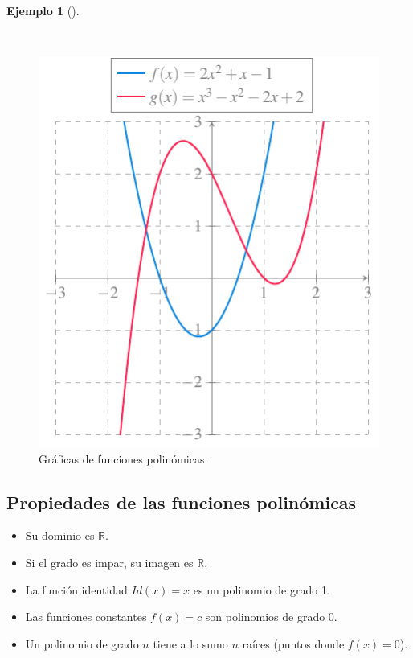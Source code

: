 \documentclass[
  a4paper,
]{scrreport}
\providecommand{\tightlist}{%
  \setlength{\itemsep}{0pt}\setlength{\parskip}{0pt}}\usepackage{longtable,booktabs,array}
\theoremstyle{definition}
\newtheorem{example}{Ejemplo}[chapter]
\theoremstyle{plain}
\theoremstyle{definition}
\theoremstyle{definition}
\theoremstyle{plain}
\theoremstyle{plain}
\theoremstyle{remark}
\begin{document}
\begin{example}[]\protect\hypertarget{exm-funcion-polinomica}{}\label{exm-funcion-polinomica}

~

\begin{figure}[H]

{\centering \includegraphics{./img/funciones/funcion-polinomica.pdf}

}

\caption{Gráficas de funciones polinómicas.}

\end{figure}%

\end{example}

\subsection{Propiedades de las funciones
polinómicas}\label{propiedades-de-las-funciones-polinuxf3micas}

\begin{itemize}
\tightlist
\item
  Su dominio es \(\mathbb{R}\).
\item
  Si el grado es impar, su imagen es \(\mathbb{R}\).
\item
  La función identidad \(Id(x)=x\) es un polinomio de grado 1.
\item
  Las funciones constantes \(f(x)=c\) son polinomios de grado 0.
\item
  Un polinomio de grado \(n\) tiene a lo sumo \(n\) raíces (puntos donde
  \(f(x)=0\)).
\end{itemize}
\end{document}
